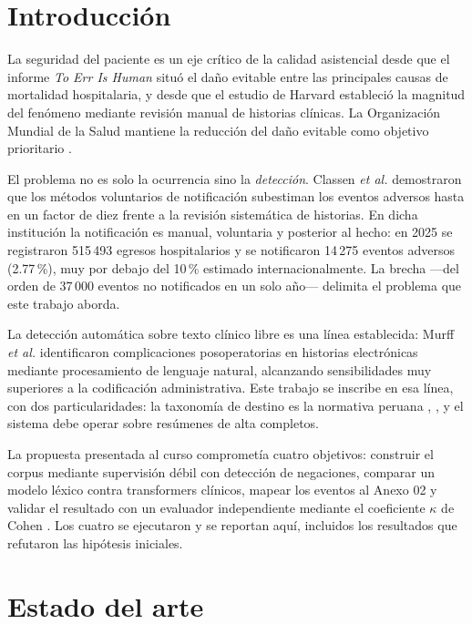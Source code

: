 \documentclass[conference]{IEEEtran}
\begin{document}
\section{Introducción}
La seguridad del paciente es un eje crítico de la calidad asistencial desde
que el informe \emph{To Err Is Human} \cite{kohn} situó el daño evitable entre
las principales causas de mortalidad hospitalaria, y desde que el estudio de
Harvard \cite{brennan} estableció la magnitud del fenómeno mediante revisión
manual de historias clínicas. La Organización Mundial de la Salud mantiene la
reducción del daño evitable como objetivo prioritario \cite{who}.

El problema no es solo la ocurrencia sino la \emph{detección}. Classen
\emph{et al.} \cite{classen} demostraron que los métodos voluntarios de
notificación subestiman los eventos adversos hasta en un factor de diez frente
a la revisión sistemática de historias. En dicha institución la notificación es manual,
voluntaria y posterior al hecho: en 2025 se registraron 515\,493 egresos
hospitalarios \cite{cifras} y se notificaron 14\,275 eventos adversos
(2.77\,\%), muy por debajo del 10\,\% estimado internacionalmente. La brecha
---del orden de 37\,000 eventos no notificados en un solo año--- delimita el
problema que este trabajo aborda.

La detección automática sobre texto clínico libre es una línea establecida:
Murff \emph{et al.} \cite{murff} identificaron complicaciones posoperatorias
en historias electrónicas mediante procesamiento de lenguaje natural,
alcanzando sensibilidades muy superiores a la codificación administrativa. Este
trabajo se inscribe en esa línea, con dos particularidades: la taxonomía de
destino es la normativa peruana \cite{directiva02}, \cite{directiva7}, y el
sistema debe operar sobre resúmenes de alta completos.

La propuesta presentada al curso comprometía cuatro objetivos: construir el
corpus mediante supervisión débil con detección de negaciones, comparar un
modelo léxico contra transformers clínicos, mapear los eventos al Anexo 02 y
validar el resultado con un evaluador independiente mediante el coeficiente
$\kappa$ de Cohen \cite{cohen}. Los cuatro se ejecutaron y se reportan aquí,
incluidos los resultados que refutaron las hipótesis iniciales.

\section{Estado del arte}
\end{document}

